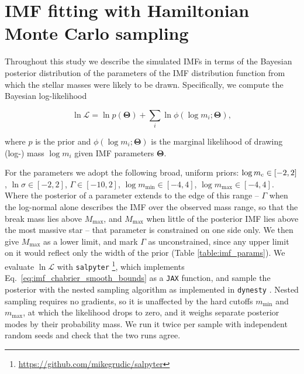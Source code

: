 \documentclass[apjl,twocolumn]{openjournal}
\begin{document}
\section{IMF fitting with Hamiltonian Monte Carlo sampling}
\label{appendix:mcmc}

Throughout this study we describe the simulated IMFs in terms of the Bayesian posterior distribution of the parameters of the IMF distribution function from which the stellar masses were likely to be drawn. Specifically, we compute the Bayesian log-likelihood

\begin{equation}
	\ln \mathcal{L} = \ln p\left(\mathbf{\Theta}\right)+\sum_i \ln \phi \left(\log m_i; \mathbf{\Theta}\right),
\end{equation}

where $p$ is the prior and $\phi \left(\log m_i; \mathbf{\Theta}\right)$ is the marginal likelihood of drawing (log-) mass $\log m_i$ given IMF parameters $\mathbf{\Theta}$.



For the parameters we adopt the following broad, uniform priors: $\log m_{\rm c} \in [-2, 2]$, $\ln\sigma \in [-2, 2]$, $\Gamma \in [-10, 2]$, $\log m_{\min} \in [-4, 4]$, $\log m_{\max} \in [-4, 4]$. Where the posterior of a parameter extends to the edge of this range -- $\Gamma$ when the log-normal alone describes the IMF over the observed mass range, so that the break mass lies above $M_{\max}$, and $M_{\max}$ when little of the posterior IMF lies above the most massive star -- that parameter is constrained on one side only. We then give $M_{\max}$ as a lower limit, and mark $\Gamma$ as unconstrained, since any upper limit on it would reflect only the width of the prior (Table \ref{table:imf_params}). We evaluate $\ln \mathcal{L}$ with \texttt{salpyter} \footnote{\url{https://github.com/mikegrudic/salpyter}}, which implements Eq.~\ref{eq:imf_chabrier_smooth_bounds} as a \texttt{JAX} function, and sample the posterior with the nested sampling algorithm \citep{skilling:2006.nested.sampling} as implemented in \texttt{dynesty} \citep{speagle:2020.dynesty}. Nested sampling requires no gradients, so it is unaffected by the hard cutoffs $m_{\min}$ and $m_{\max}$, at which the likelihood drops to zero, and it weighs separate posterior modes by their probability mass. We run it twice per sample with independent random seeds and check that the two runs agree.






\end{document}
